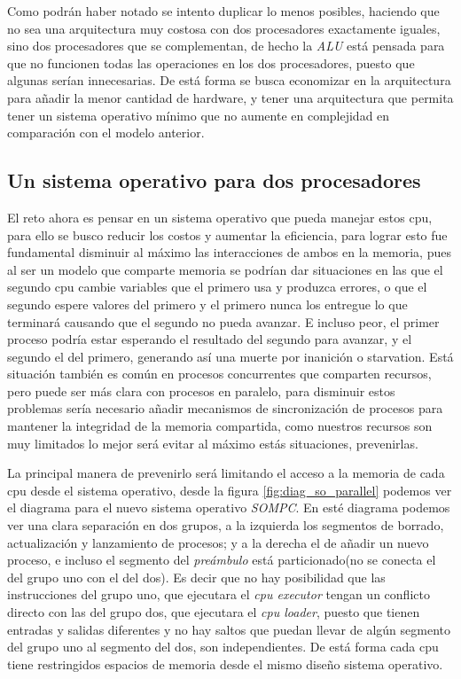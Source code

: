 \documentclass[letterpaper,12pt,oneside]{book}
\begin{document}
		
		Como podrán haber notado se intento duplicar lo menos posibles, haciendo que no sea una arquitectura muy costosa con dos procesadores exactamente iguales,
		sino dos procesadores que se complementan, de hecho la \textit{ALU} está pensada para que no funcionen todas las operaciones en los dos procesadores,
		puesto que algunas serían innecesarias. De está forma se busca economizar en la arquitectura para añadir la menor cantidad de hardware, y tener
		una arquitectura que permita tener un sistema operativo mínimo que no aumente en complejidad en comparación con el modelo anterior.
	 	
	 	\clearpage
	 	
	 	\subsection{Un sistema operativo para dos procesadores}
	 		
	 		El reto ahora es pensar en un sistema operativo que pueda manejar estos cpu, para ello se busco reducir los costos
	 		y aumentar la eficiencia, para lograr esto fue fundamental disminuir al máximo las interacciones de ambos en la memoria, pues al
	 		ser un modelo que comparte memoria se podrían dar situaciones en las que el segundo cpu cambie variables que el primero usa y produzca errores,
	 		o que el segundo espere valores del primero y el primero nunca los entregue lo que terminará causando que el segundo no pueda avanzar. E incluso
	 		peor, el primer proceso podría estar esperando el resultado del segundo para avanzar, y el segundo el del primero, generando así
	 		una muerte por inanición o starvation. Está situación también es común en procesos concurrentes que comparten recursos, pero
	 		puede ser más clara con procesos en paralelo, para disminuir estos problemas sería necesario añadir mecanismos de sincronización de procesos para
	 		mantener la integridad de la memoria compartida, como nuestros recursos son muy limitados lo mejor será evitar al máximo estás situaciones, prevenirlas.
	 		
	 		La principal manera de prevenirlo será limitando el acceso a la memoria de cada cpu desde el sistema operativo, desde la figura \ref{fig:diag_so_parallel}
	 		podemos ver el diagrama para el nuevo sistema operativo \textit{SOMPC}. En esté diagrama podemos ver una clara separación en dos grupos, a la izquierda
	 		los segmentos de borrado, actualización y lanzamiento de procesos; y a la derecha el de añadir un nuevo proceso, e incluso el segmento
	 		del \textit{preámbulo} está particionado(no se conecta el del grupo uno con el del dos). Es decir que no hay posibilidad que las instrucciones
	 		del grupo uno, que ejecutara el \textit{cpu executor} tengan un conflicto directo con las del grupo dos, que ejecutara el \textit{cpu loader}, puesto
	 		que tienen entradas y salidas diferentes y no hay saltos que puedan llevar de algún segmento del grupo uno al segmento
	 		del dos, son independientes. De está forma cada cpu tiene restringidos espacios de memoria desde el mismo diseño sistema operativo.
	 		
\end{document}
